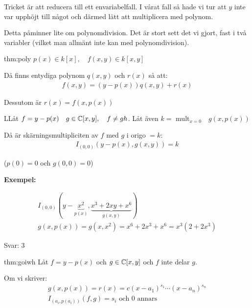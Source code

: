 \par\bigskip
\noindent Tricket är att reducera till ett envariabelfall. I vårat fall så hade vi tur att $y$ inte var upphöjt till något och därmed lätt att multiplicera med polynom.
\par\bigskip
\noindent Detta påminner lite om polynomdivision. Det är stort sett det vi gjort, fast i två variabler (vilket man allmänt inte kan med polynomdivision).
\par\bigskip
\begin{theo}{thm:poly}
  $p(x)\in k[x],\quad f(x,y)\in k[x,y]$\par
  \noindent Då finns entydiga polynom $q(x,y)$ och $r(x)$ så att:
  \begin{equation*}
    \begin{gathered}
      f(x,y) = (y-p(x))q(x,y)+r(x)
    \end{gathered}
  \end{equation*}\par
  \noindent Dessutom är $r(x) = f(x,p(x))$
\end{theo}
\par\bigskip
\begin{theo}
  LLåt $f=y-p(x)\quad g\in\mathbb{C}[x,y],\quad f\neq gh$. Låt även $k= $ mult$_{x=0}\quad g(x,p(x))$\par
  \noindent Då är skärningsmultipliciten av $f$ med $g$ i origo $=k$:
  \begin{equation*}
    \begin{gathered}
      I_{(0,0)}(y-p(x),g(x,y))=k
    \end{gathered}
  \end{equation*}
  \par\bigskip
  \noindent ($p(0)=0$ och $g(0,0)=0$)
\end{theo}
\par\bigskip
\noindent\textbf{Exempel:}\par
\begin{equation*}
  \begin{gathered}
    I_{(0,0)}(y-\underbrace{x^2}_{\text{$p(x)$}},\underbrace{x^3+2xy+x^6}_{\text{$g(x,y)$}})\\
    g(x,p(x)) = g(x,x^2) = x^6+2x^3+x^6 = x^3(2+2x^3)
  \end{gathered}
\end{equation*}\par
\noindent Svar: 3
\par\bigskip
\begin{theo}{thm:goiwh}
  Låt $f=y-p(x)$ och $g\in\mathbb{C}[x,y]$ och $f$ inte delar $g$.\par
  \noindent Om vi skriver:
  \begin{equation*}
    \begin{gathered}
      g(x,p(x)) = r(x) = c(x-a_1)^{s_1}\cdots(x-a_n)^{s_n}\\
      I_{(a_i,p(a_i))}(f,g) = s_i\text{ och 0 annars}
    \end{gathered}
  \end{equation*}
\end{theo}
